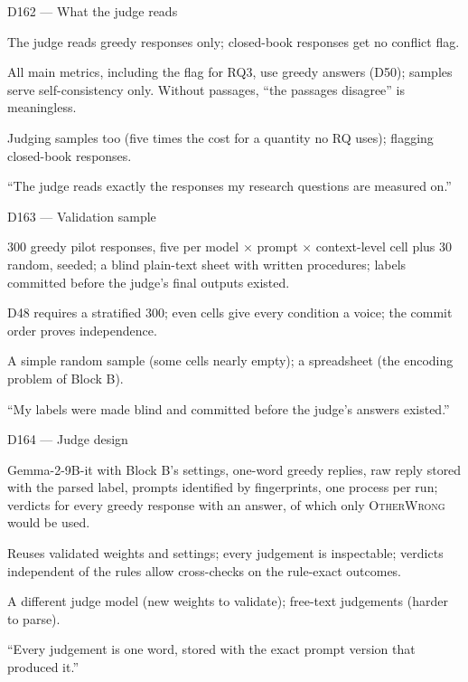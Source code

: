 \documentclass[11pt,a4paper]{report}
\begin{document}
\begin{decisionbox}{D162 --- What the judge reads}
\begin{description}[nosep, leftmargin=0pt]
  \item[Decision.] The judge reads greedy responses only; closed-book responses get no conflict flag.
  \item[Why.] All main metrics, including the flag for RQ3, use greedy answers (D50); samples serve self-consistency only. Without passages, ``the passages disagree'' is meaningless.
  \item[Alternatives.] Judging samples too (five times the cost for a quantity no RQ uses); flagging closed-book responses.
  \item[Interview line.] ``The judge reads exactly the responses my research questions are measured on.''
\end{description}
\end{decisionbox}

\begin{decisionbox}{D163 --- Validation sample}
\begin{description}[nosep, leftmargin=0pt]
  \item[Decision.] 300 greedy pilot responses, five per model $\times$ prompt $\times$ context-level cell plus 30 random, seeded; a blind plain-text sheet with written procedures; labels committed before the judge's final outputs existed.
  \item[Why.] D48 requires a stratified 300; even cells give every condition a voice; the commit order proves independence.
  \item[Alternatives.] A simple random sample (some cells nearly empty); a spreadsheet (the encoding problem of Block B).
  \item[Interview line.] ``My labels were made blind and committed before the judge's answers existed.''
\end{description}
\end{decisionbox}

\begin{decisionbox}{D164 --- Judge design}
\begin{description}[nosep, leftmargin=0pt]
  \item[Decision.] Gemma-2-9B-it with Block B's settings, one-word greedy replies, raw reply stored with the parsed label, prompts identified by fingerprints, one process per run; verdicts for every greedy response with an answer, of which only \textsc{OtherWrong} would be used.
  \item[Why.] Reuses validated weights and settings; every judgement is inspectable; verdicts independent of the rules allow cross-checks on the rule-exact outcomes.
  \item[Alternatives.] A different judge model (new weights to validate); free-text judgements (harder to parse).
  \item[Interview line.] ``Every judgement is one word, stored with the exact prompt version that produced it.''
\end{description}
\end{decisionbox}
\end{document}
